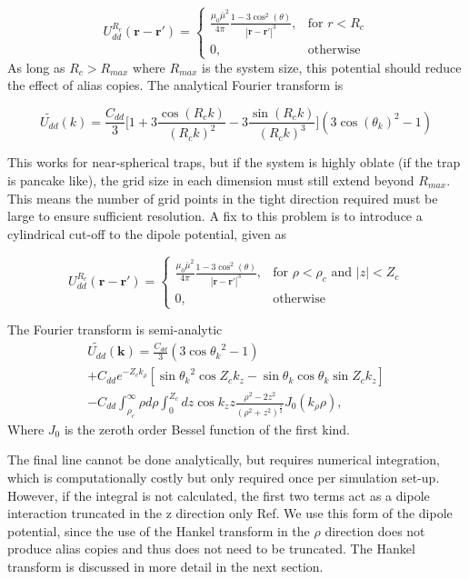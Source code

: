 \documentclass[10pt]{article}
\numberwithin{equation}{section}
\begin{document}
\begin{multicols}{2}
\begin{equation}
U_{dd}^{R_c}(\textbf{r}-\textbf{r}') = 
\begin{cases}
\frac{\mu_{0} \bar{\mu}^2}{4\pi} \frac{1-3 \cos^2{(\theta)}}{|\textbf{r}-\textbf{r}'|^3}, & \text{for $r<R_c$} \\
0, & \text{otherwise}
\end{cases}
\end{equation}
As long as $R_c > R_{max}$ where $R_{max}$ is the system size, this potential should reduce the effect of alias copies. The analytical Fourier transform is
 
\begin{equation}
\tilde{U_{dd}}(k) = \frac{C_{dd}}{3}\bigg[1+3\frac{\cos(R_{c}k)}{(R_{c}k)^{2}}-3\frac{\sin(R_{c}k)}{(R_{c}k)^{3}}\bigg](3\cos{(\theta_{k})^2}-1)
\end{equation}

This works for near-spherical traps, but if the system is highly oblate (if the trap is pancake like), the grid size in each dimension must still extend beyond $R_{max}$. This means the number of grid points in the tight direction required must be large to ensure sufficient resolution. A fix to this problem is to introduce a cylindrical cut-off to the dipole potential, given as

\begin{equation}
U_{dd}^{R_c}(\textbf{r}-\textbf{r}') = 
\begin{cases}
\frac{\mu_{0} \bar{\mu}^2}{4\pi} \frac{1-3 \cos^2{(\theta)}}{|\textbf{r}-\textbf{r}'|^3}, & \text{for $\rho<\rho_c$ and $|z|<Z_c$} \\
0, & \text{otherwise}
\end{cases}
\end{equation}

The Fourier transform is semi-analytic \cite{bland2018elementary}
\begin{multline}
\tilde{U_{dd}}(\textbf{k}) = \frac{C_{dd}}{3}(3\cos{\theta_k}^{2}-1) \\+ C_{dd}e^{-Z_{c}k_{\rho}}[\sin{\theta_{k}}^{2}\cos{Z_{c}k_{z}} -\sin{\theta_{k}}\cos{\theta_{k}}\sin{Z_{c}k_{z}}] \\- C_{dd}\int_{\rho_{c}}^{\infty}\rho d\rho\int_{0}^{Z_{c}}dz\cos{k_{z}z}\frac{\rho^{2}-2z^{2}}{(\rho^{2}+z^{2})^{\frac{5}{2}}}J_{0}(k_{\rho}\rho),
\end{multline} 
Where $J_{0}$ is the zeroth order Bessel function of the first kind.

The final line cannot be done analytically, but requires numerical integration, which is computationally costly but only required once per simulation set-up. However, if the integral is not calculated, the first two terms act as a dipole interaction truncated in the z direction only Ref\cite{Ronen_2006}. We use this form of the dipole potential, since the use of the Hankel transform in the $\rho$ direction does not produce alias copies and thus does not need to be truncated. The Hankel transform is discussed in more detail in the next section.


\end{multicols}
\end{document}

